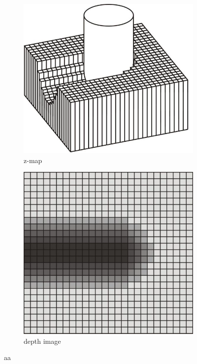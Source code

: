 \begin{description}
	\begin{figure}[h]
		\centering
		\begin{subfigure}[b]{0.4\textwidth}
			\includegraphics[width=\textwidth]{images/zmap}
			\caption{z-map}
		\end{subfigure}
		\begin{subfigure}[b]{0.4\textwidth}
			\includegraphics[width=\textwidth]{images/depth_image}
			\caption{depth image}
		\end{subfigure}
		\caption{aa}
		\label{fig:zmap_depth_image}
	\end{figure}
	

\end{description}
